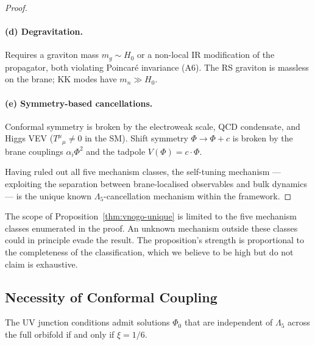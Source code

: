\begin{proof}
\paragraph{(d) Degravitation.} Requires a graviton mass $m_g \sim H_0$ or a non-local IR modification of the propagator, both violating Poincar\'e invariance (A6). The RS graviton is massless on the brane; KK modes have $m_n \gg H_0$.

\paragraph{(e) Symmetry-based cancellations.} Conformal symmetry is broken by the electroweak scale, QCD condensate, and Higgs VEV ($T^\mu{}_\mu \neq 0$ in the SM). Shift symmetry $\Phi \to \Phi + c$ is broken by the brane couplings $\alpha_i\Phi^2$ and the tadpole $V(\Phi) = c\cdot\Phi$.

Having ruled out all five mechanism classes, the self-tuning mechanism --- exploiting the separation between brane-localised observables and bulk dynamics --- is the unique known $\Lambda_5$-cancellation mechanism within the framework.
\end{proof}

\begin{remark}
The scope of Proposition~\ref{thm:vnogo-unique} is limited to the five mechanism classes enumerated in the proof. An unknown mechanism outside these classes could in principle evade the result. The proposition's strength is proportional to the completeness of the classification, which we believe to be high but do not claim is exhaustive.
\end{remark}

\subsection{Necessity of Conformal Coupling}
\label{sec:3-vnogo-xi}

\begin{proposition}[Necessity of $\xi = 1/6$]
\label{thm:vnogo-xi}
The UV junction conditions admit solutions $\Phi_0$ that are independent of $\Lambda_5$ across the full orbifold if and only if $\xi = 1/6$.
\end{proposition}

